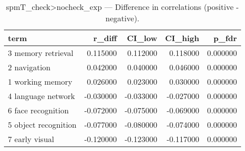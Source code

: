 \begin{table}
\caption{spmT_check>nocheck_exp — Difference in correlations (positive - negative).}
\label{tab:spmT_check>nocheck_exp_diff}
\begin{tabular}{lrrrr}
\toprule
term & r\_diff & CI\_low & CI\_high & p\_fdr \\
\midrule
3 memory retrieval & 0.115000 & 0.112000 & 0.118000 & 0.000000 \\
2 navigation & 0.042000 & 0.040000 & 0.046000 & 0.000000 \\
1 working memory & 0.026000 & 0.023000 & 0.030000 & 0.000000 \\
4 language network & -0.030000 & -0.033000 & -0.027000 & 0.000000 \\
6 face recognition & -0.072000 & -0.075000 & -0.069000 & 0.000000 \\
5 object recognition & -0.077000 & -0.080000 & -0.074000 & 0.000000 \\
7 early visual & -0.120000 & -0.123000 & -0.117000 & 0.000000 \\
\bottomrule
\end{tabular}
\end{table}
